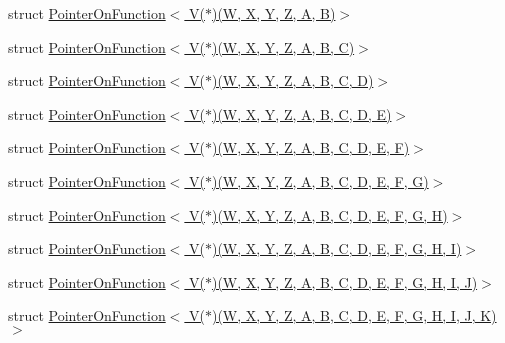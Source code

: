 \begin{DoxyCompactItemize}
\item 
struct \hyperlink{structutilspp_1_1PointerOnFunction_3_01V_07_5_08_07W_00_01X_00_01Y_00_01Z_00_01A_00_01B_08_4}{Pointer\-On\-Function$<$ V($\ast$)(\-W, X, Y, Z, A, B)$>$}
\item 
struct \hyperlink{structutilspp_1_1PointerOnFunction_3_01V_07_5_08_07W_00_01X_00_01Y_00_01Z_00_01A_00_01B_00_01C_08_4}{Pointer\-On\-Function$<$ V($\ast$)(\-W, X, Y, Z, A, B, C)$>$}
\item 
struct \hyperlink{structutilspp_1_1PointerOnFunction_3_01V_07_5_08_07W_00_01X_00_01Y_00_01Z_00_01A_00_01B_00_01C_00_01D_08_4}{Pointer\-On\-Function$<$ V($\ast$)(\-W, X, Y, Z, A, B, C, D)$>$}
\item 
struct \hyperlink{structutilspp_1_1PointerOnFunction_3_01V_07_5_08_07W_00_01X_00_01Y_00_01Z_00_01A_00_01B_00_01C_00_01D_00_01E_08_4}{Pointer\-On\-Function$<$ V($\ast$)(\-W, X, Y, Z, A, B, C, D, E)$>$}
\item 
struct \hyperlink{structutilspp_1_1PointerOnFunction_3_01V_07_5_08_07W_00_01X_00_01Y_00_01Z_00_01A_00_01B_00_01C_00_01D_00_01E_00_01F_08_4}{Pointer\-On\-Function$<$ V($\ast$)(\-W, X, Y, Z, A, B, C, D, E, F)$>$}
\item 
struct \hyperlink{structutilspp_1_1PointerOnFunction_3_01V_07_5_08_07W_00_01X_00_01Y_00_01Z_00_01A_00_01B_00_01C_00_01D_00_01E_00_01F_00_01G_08_4}{Pointer\-On\-Function$<$ V($\ast$)(\-W, X, Y, Z, A, B, C, D, E, F, G)$>$}
\item 
struct \hyperlink{structutilspp_1_1PointerOnFunction_3_01V_07_5_08_07W_00_01X_00_01Y_00_01Z_00_01A_00_01B_00_01C_0aa55322b0a01a25603f55328f88cca8b}{Pointer\-On\-Function$<$ V($\ast$)(\-W, X, Y, Z, A, B, C, D, E, F, G, H)$>$}
\item 
struct \hyperlink{structutilspp_1_1PointerOnFunction_3_01V_07_5_08_07W_00_01X_00_01Y_00_01Z_00_01A_00_01B_00_01C_028efef8fb2e99a7c8e542e8efa07b21c}{Pointer\-On\-Function$<$ V($\ast$)(\-W, X, Y, Z, A, B, C, D, E, F, G, H, I)$>$}
\item 
struct \hyperlink{structutilspp_1_1PointerOnFunction_3_01V_07_5_08_07W_00_01X_00_01Y_00_01Z_00_01A_00_01B_00_01C_03a6125eb0651b1f0d51b556b7bb56895}{Pointer\-On\-Function$<$ V($\ast$)(\-W, X, Y, Z, A, B, C, D, E, F, G, H, I, J)$>$}
\item 
struct \hyperlink{structutilspp_1_1PointerOnFunction_3_01V_07_5_08_07W_00_01X_00_01Y_00_01Z_00_01A_00_01B_00_01C_0b606863df3010e6d72b4ceda3747c75c}{Pointer\-On\-Function$<$ V($\ast$)(\-W, X, Y, Z, A, B, C, D, E, F, G, H, I, J, K)$>$}
\end{DoxyCompactItemize}
